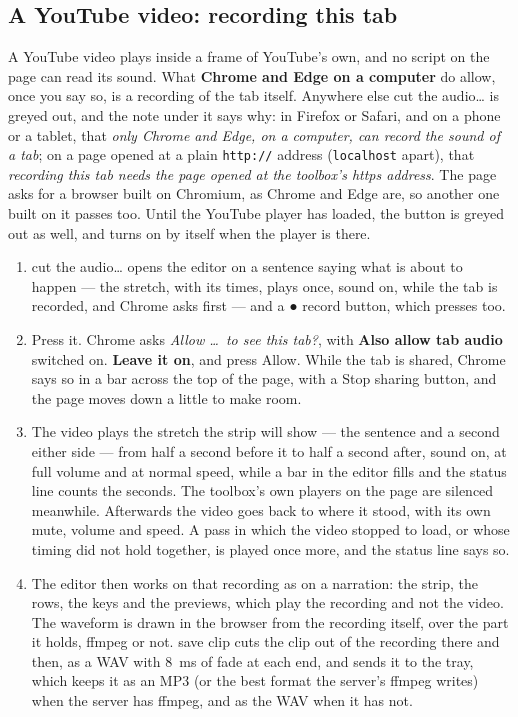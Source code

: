 \documentclass[11pt,oneside]{report}
\newcommand{\sym}[1]{{\symfont #1}}
\newcommand{\key}[1]{\textsf{\small\fbox{#1}}}
\newcommand{\menu}[1]{\textsf{#1}}
\begin{document}
\subsection*{A YouTube video: recording this tab}

A YouTube video plays inside a frame of YouTube's own, and no script on the
page can read its sound. What \textbf{Chrome and Edge on a computer} do
allow, once you say so, is a recording of the tab itself. Anywhere else
\menu{cut the audio\ldots} is greyed out, and the note under it says why:
in Firefox or Safari, and on a phone or a tablet, that \emph{only Chrome
and Edge, on a computer, can record the sound of a tab}; on a page opened
at a plain \texttt{http://} address (\texttt{localhost} apart), that
\emph{recording this tab needs the page opened at the toolbox's https
address}. The page asks for a browser built on Chromium, as Chrome and Edge
are, so another one built on it passes too. Until the YouTube player has
loaded, the button is greyed out as well, and turns on by itself when the
player is there.

\begin{enumerate}
\item \menu{cut the audio\ldots} opens the editor on a sentence saying what
  is about to happen --- the stretch, with its times, plays once, sound on,
  while the tab is recorded, and Chrome asks first --- and a
  \menu{\sym{●} record} button, which \key{Enter} presses too.
\item Press it. Chrome asks \emph{Allow \ldots\ to see this tab?}, with
  \textbf{Also allow tab audio} switched on. \textbf{Leave it on}, and
  press \menu{Allow}. While the tab is shared, Chrome says so in a bar
  across the top of the page, with a \menu{Stop sharing} button, and the
  page moves down a little to make room.
\item The video plays the stretch the strip will show --- the sentence and
  a second either side --- from half a second before it to half a second
  after, sound on, at full volume and at normal speed, while a bar in the
  editor fills and the status line counts the seconds. The toolbox's own
  players on the page are silenced meanwhile. Afterwards the video goes
  back to where it stood, with its own mute, volume and speed. A pass in
  which the video stopped to load, or whose timing did not hold together,
  is played once more, and the status line says so.
\item The editor then works on that recording as on a narration: the
  strip, the rows, the keys and the previews, which play the recording and
  not the video. The waveform is drawn in the browser from the recording
  itself, over the part it holds, ffmpeg or not. \menu{save clip} cuts the
  clip out of the recording there and then, as a WAV with 8~ms of fade at
  each end, and sends it to the tray, which keeps it as an MP3 (or the best
  format the server's ffmpeg writes) when the server has ffmpeg, and as the
  WAV when it has not.
\end{enumerate}
\end{document}
